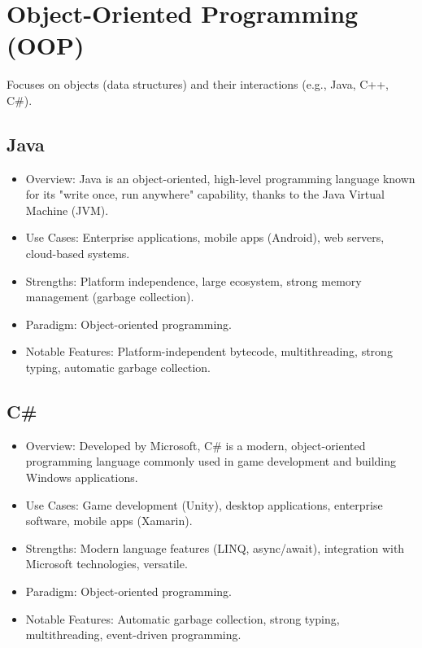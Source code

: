 \documentclass[openany]{book} %
\begin{document}
\section{Object-Oriented Programming (OOP)}
Focuses on objects (data structures) and their interactions (e.g., Java, C++, C\#).
\subsection{Java}
\begin{itemize}
\item Overview: Java is an object-oriented, high-level programming language known for its "write once, run anywhere" capability, thanks to the Java Virtual Machine (JVM).
\item Use Cases: Enterprise applications, mobile apps (Android), web servers, cloud-based systems.
\item Strengths: Platform independence, large ecosystem, strong memory management (garbage collection).
\item Paradigm: Object-oriented programming.
\item Notable Features: Platform-independent bytecode, multithreading, strong typing, automatic garbage collection.
\end{itemize}

\subsection{C\#}
\begin{itemize}
\item Overview: Developed by Microsoft, C\# is a modern, object-oriented programming language commonly used in game development and building Windows applications.
\item Use Cases: Game development (Unity), desktop applications, enterprise software, mobile apps (Xamarin).
\item Strengths: Modern language features (LINQ, async/await), integration with Microsoft technologies, versatile.
\item Paradigm: Object-oriented programming.
\item Notable Features: Automatic garbage collection, strong typing, multithreading, event-driven programming.
\end{itemize}
\end{document}

